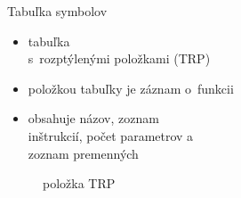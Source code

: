 \documentclass[pdf,fyma2,total]{prosper}
\begin{document}

\begin{slide}{Tabuľka symbolov}
\begin{multicols}{2}

    \begin{small}
        \begin{itemize}
            \item{tabuľka\\s~rozptýlenými položkami (TRP)}
            \medskip
            \item{položkou tabuľky je záznam o~funkcii}
            \medskip
            \item{obsahuje názov, zoznam\\inštrukcií, počet parametrov a\\zoznam
            premenných}
        \end{itemize}
    \end{small}
    \bigskip
    \begin{center}
        \begin{figure}[h!]
            \caption{\small{položka TRP}}
            \label{int-obr1}
        \end{figure}
    \end{center}

\end{multicols}
\end{slide}
\end{document}

